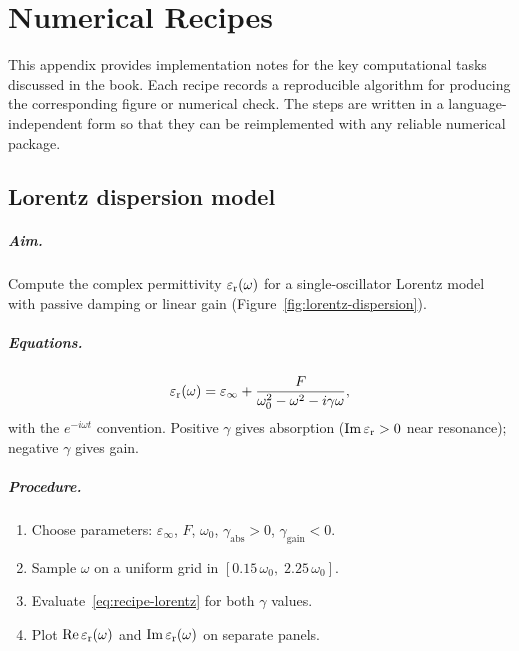 \chapter{Numerical Recipes}
\label{app:numerical-recipes}

This appendix provides implementation notes for the key
computational tasks discussed in the book. Each recipe records a
reproducible algorithm for producing the corresponding figure or numerical
check. The steps are written in a language-independent form so that they
can be reimplemented with any reliable numerical package.


\section{Lorentz dispersion model}
\label{sec:recipe-lorentz}

\paragraph{Aim.}
Compute the complex permittivity $\varepsilon_{\mathrm{r}}(\omega)$ for a single-oscillator
Lorentz model with passive damping or linear gain
(Figure~\ref{fig:lorentz-dispersion}).

\paragraph{Equations.}
\begin{equation}
 \varepsilon_{\mathrm{r}}(\omega) = \varepsilon_\infty
 + \frac{F}{\omega_0^2 - \omega^2 - i\gamma\omega},
 \label{eq:recipe-lorentz}
\end{equation}
with the $e^{-i\omega t}$ convention. Positive $\gamma$ gives
absorption ($\operatorname{Im}\varepsilon_{\mathrm{r}} > 0$ near resonance); negative $\gamma$ gives
gain.

\paragraph{Procedure.}
\begin{enumerate}
 \item Choose parameters: $\varepsilon_\infty$, $F$, $\omega_0$,
 $\gamma_{\mathrm{abs}} > 0$, $\gamma_{\mathrm{gain}} < 0$.
 \item Sample $\omega$ on a uniform grid in
 $[0.15\,\omega_0,\; 2.25\,\omega_0]$.
 \item Evaluate~\eqref{eq:recipe-lorentz} for both $\gamma$ values.
 \item Plot $\operatorname{Re}\varepsilon_{\mathrm{r}}(\omega)$ and $\operatorname{Im}\varepsilon_{\mathrm{r}}(\omega)$ on separate
 panels.
\end{enumerate}

